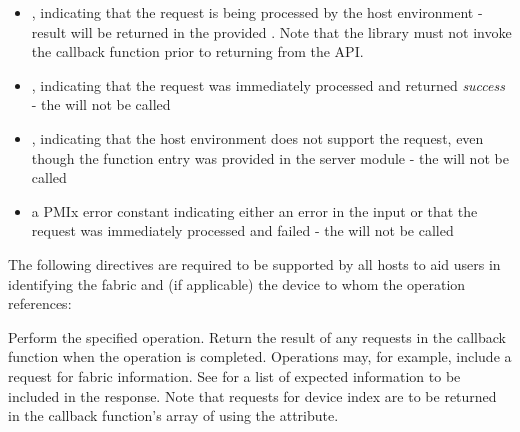 \begin{itemize}
    \item {}, indicating that the request is being processed by the host environment - result will be returned in the provided . Note that the library must not invoke the callback function prior to returning from the \ac{API}.
    \item {}, indicating that the request was immediately processed and returned \textit{success} - the  will not be called
    \item {}, indicating that the host environment does not support the request, even though the function entry was provided in the server module - the  will not be called
    \item a PMIx error constant indicating either an error in the input or that the request was immediately processed and failed - the  will not be called
\end{itemize}

\reqattrstart
The following directives are required to be supported by all hosts to aid users in identifying the fabric and (if applicable) the device to whom the operation references:


\reqattrend

\descr

Perform the specified operation. Return the result of any requests in the callback function when the operation is completed. Operations may, for example, include a request for fabric information. See  for a list of expected information to be included in the response. Note that requests for device index are to be returned in the callback function's array of  using the  attribute.

